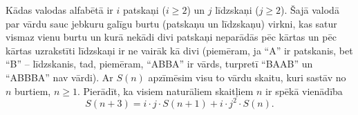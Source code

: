 \documentclass[a4paper,12pt]{article}
\begin{document}
\vspace{10pt}
\begin{problem}
Kādas valodas alfabētā ir $i$ patskaņi ($i \geq 2$) un $j$ līdzskaņi ($j \geq 2$). 
Šajā valodā par vārdu sauc jebkuru galīgu burtu (patskaņu un līdzskaņu) virkni, 
kas satur vismaz vienu burtu un kurā nekādi divi patskaņi neparādās pēc kārtas 
un pēc kārtas uzrakstīti līdzskaņi ir ne vairāk kā divi (piemēram, ja ``A'' ir patskanis, 
bet ``B'' – līdzskanis, tad, piemēram, ``ABBA'' ir vārds, turpretī ``BAAB'' un ``ABBBA'' nav vārdi). 
Ar $S(n)$ apzīmēsim visu to vārdu skaitu, kuri sastāv no $n$ burtiem, $n \geq 1$. 
Pierādīt, ka visiem naturāliem skaitļiem $n$ ir spēkā vienādība
\[ S(n+3) = i \cdot j \cdot S(n+1) + i \cdot j^2 \cdot S(n). \]
\end{problem}
\end{document}
